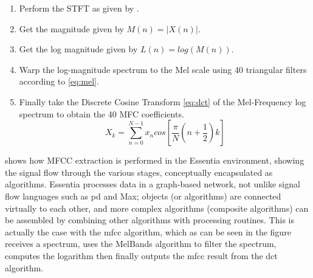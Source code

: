 {{\begin{enumerate}
  \item Perform the STFT as given by .
  \item Get the magnitude given by $M(n) = |X(n)|$.
  \item Get the log magnitude given by $L(n) = log(M(n))$.
  \item Warp the log-magnitude spectrum to the Mel scale using 40 triangular filters according to \eqref{eq:mel}.
  \item Finally take the Discrete Cosine Transform \eqref{eq:dct} of the Mel-Frequency log spectrum to obtain the 40 MFC coefficients.
  \begin{equation}
	\label{eq:dct}	
	X_k=\sum_{n=0}^{N-1}x_n cos [\frac{\pi}{N}(n+\frac{1}{2})k]
	\end{equation}
\end{enumerate}

 shows how MFCC extraction is performed in the Essentia environment, showing the signal flow through the various stages, conceptually encapsulated as algorithms. Essentia processes data in a graph-based network, not unlike signal flow languages such as \acrshort{pd} and Max; objects (or algorithms) are connected virtually to each other, and more complex algorithms (composite algorithms) can be assembled by combining other algorithms with processing routines. This is actually the case with the \acrshort{mfcc} algorithm, which as can be seen in the figure receives a spectrum, uses the MelBands algorithm to filter the spectrum, computes the logarithm then finally outputs the \acrshort{mfcc} result from the \acrshort{dct} algorithm. 

}}
